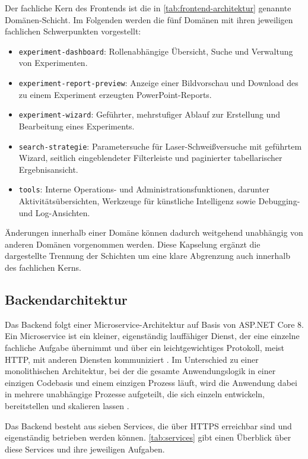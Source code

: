 Der fachliche Kern des Frontends ist die in \autoref{tab:frontend-architektur} genannte Domänen-Schicht. Im Folgenden werden die fünf Domänen mit ihren jeweiligen fachlichen Schwerpunkten vorgestellt:

\begin{itemize}
    \item \texttt{experiment-dashboard}: Rollenabhängige Übersicht, Suche und Verwaltung von Experimenten.
    \item \texttt{experiment-report-preview}: Anzeige einer Bildvorschau und Download des zu einem Experiment erzeugten PowerPoint-Reports.
    \item \texttt{experiment-wizard}: Geführter, mehrstufiger Ablauf zur Erstellung und Bearbeitung eines Experiments.
    \item \texttt{search-strategie}: Parametersuche für Laser-Schweißversuche mit geführtem Wizard, seitlich eingeblendeter Filterleiste und paginierter tabellarischer Ergebnisansicht.
    \item \texttt{tools}: Interne Operations- und Administrationsfunktionen, darunter Aktivitätsübersichten, Werkzeuge für künstliche Intelligenz sowie Debugging- und Log-Ansichten.
\end{itemize}

Änderungen innerhalb einer Domäne können dadurch weitgehend unabhängig von anderen Domänen vorgenommen werden. Diese Kapselung ergänzt die dargestellte Trennung der Schichten um eine klare Abgrenzung auch innerhalb des fachlichen Kerns.

\subsection{Backendarchitektur}

Das Backend folgt einer Microservice-Architektur auf Basis von ASP.NET Core 8. Ein Microservice ist ein kleiner, eigenständig lauffähiger Dienst, der eine einzelne fachliche Aufgabe übernimmt und über ein leichtgewichtiges Protokoll, meist \ac{HTTP}, mit anderen Diensten kommuniziert \autocite{FowlerLewis2014}. Im Unterschied zu einer monolithischen Architektur, bei der die gesamte Anwendungslogik in einer einzigen Codebasis und einem einzigen Prozess läuft, wird die Anwendung dabei in mehrere unabhängige Prozesse aufgeteilt, die sich einzeln entwickeln, bereitstellen und skalieren lassen \autocite{DiFrancesco2017}.

Das Backend besteht aus sieben Services, die über \ac{HTTPS} erreichbar sind und eigenständig betrieben werden können. \autoref{tab:services} gibt einen Überblick über diese Services und ihre jeweiligen Aufgaben.

